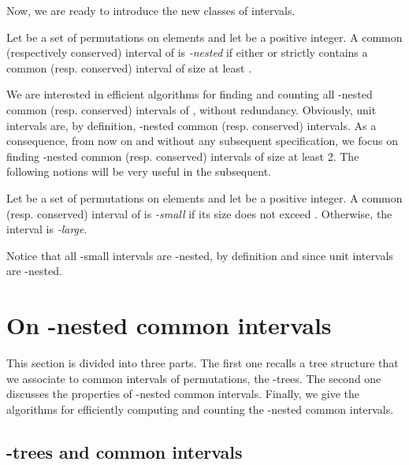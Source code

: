 \documentclass{article}
\begin{document}
Now, we are ready to introduce the new classes of intervals.

\begin{definition}
  \label{def:bnested-intervals}
  Let  be a set of  permutations
  on  elements and let  be a positive integer. 
  A common  (respectively conserved) interval of   
  is {\em -nested} if either  or  strictly contains a common (resp. conserved)  interval of size at 
  least .
\end{definition}

We are interested in efficient algorithms for finding and counting all 
-nested common  (resp. conserved)
intervals of , without redundancy. 
Obviously,
unit intervals are, by definition, -nested common (resp. conserved) intervals.
As a consequence, from now on and without any subsequent specification, we 
focus on finding -nested common (resp. conserved)  intervals of size at
least 2.
The following notions will be very useful in the subsequent.

\begin{definition}
 Let  be a set of  permutations
  on  elements and let  be a positive integer. 
  A common  (resp. conserved) interval of   
  is {\em -small} if its size does not exceed . Otherwise, the interval is {\em -large}.
\end{definition}


Notice that all -small intervals are -nested, by definition and since unit intervals are -nested.

\section{On  -nested common intervals}\label{sect:PQ}

This section is divided into three parts. The first one recalls a tree structure that we associate
to common intervals of permutations, the -trees. The second one discusses the properties of
-nested common intervals. Finally, we give the algorithms for efficiently computing and counting
the -nested common intervals.
 
\subsection{-trees and common intervals}
\end{document}
